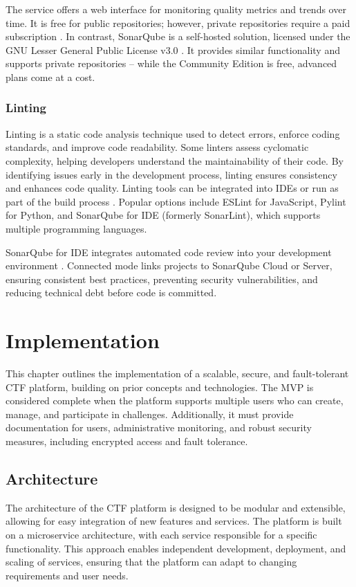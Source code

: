 The service offers a web interface for monitoring quality metrics and trends over time. It is free for public repositories; however, private repositories require a paid subscription \Parencite{SonarCloudPricing2025}. In contrast, SonarQube is a self-hosted solution, licensed under the GNU Lesser General Public License v3.0 \Parencite{SonarQubeLicense2025}. It provides similar functionality and supports private repositories -- while the Community Edition is free, advanced plans come at a cost.

\subsection{Linting}
Linting is a static code analysis technique used to detect errors, enforce coding standards, and improve code readability. Some linters assess cyclomatic complexity, helping developers understand the maintainability of their code. By identifying issues early in the development process, linting ensures consistency and enhances code quality. Linting tools can be integrated into IDEs or run as part of the build process \Parencite{SuperLinter2025}. Popular options include ESLint for JavaScript, Pylint for Python, and SonarQube for IDE (formerly SonarLint), which supports multiple programming languages.

SonarQube for IDE integrates automated code review into your development environment \Parencite{SonarQubeConnectedMode2025}. Connected mode links projects to SonarQube Cloud or Server, ensuring consistent best practices, preventing security vulnerabilities, and reducing technical debt before code is committed.

\chapter{Implementation}\label{chap:implementation}
This chapter outlines the implementation of a scalable, secure, and fault-tolerant CTF platform, building on prior concepts and technologies. The MVP is considered complete when the platform supports multiple users who can create, manage, and participate in challenges. Additionally, it must provide documentation for users, administrative monitoring, and robust security measures, including encrypted access and fault tolerance.

\section{Architecture}\label{sec:architecture}
The architecture of the CTF platform is designed to be modular and extensible, allowing for easy integration of new features and services. The platform is built on a microservice architecture, with each service responsible for a specific functionality. This approach enables independent development, deployment, and scaling of services, ensuring that the platform can adapt to changing requirements and user needs.

